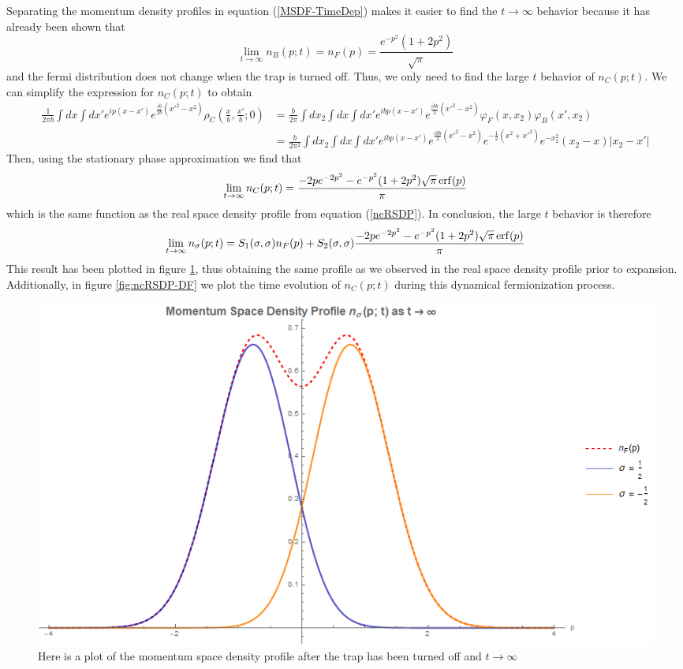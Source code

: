 \documentclass[onecolumn,english,aps,pra]{revtex4}
\begin{document}
Separating the momentum density profiles in equation (\ref{MSDF-TimeDep}) makes it  easier to find the $t \rightarrow \infty$ behavior because it has already been shown \cite{minguzzi2005exact} that
\begin{equation}
\lim_{t \rightarrow \infty} n_B(p;t) = n_F(p) = \frac{e^{-p^2}(1+2p^2)}{\sqrt{\pi}}
\end{equation}
and the fermi distribution does not change when the trap is turned off. Thus, we only need to find the large $t$ behavior of $n_C(p;t)$. We can simplify the expression for $n_C(p;t)$ to obtain
\begin{align*}
\frac{1}{2\pi b} \int dx \int dx' e^{ip(x-x')} e^{\frac{i\dot{b}}{2b}(x'^2 - x^2)}
\rho_C\left(\frac{x}{b},\frac{x'}{b};0\right) 
&= \frac{b}{2\pi} \int dx_2 \int dx \int dx' e^{ibp(x-x')} e^{\frac{i\dot{b}b}{2}(x'^2 - x^2)}
\varphi_F(x,x_2)\varphi_B(x',x_2)\\
&= \frac{b}{2\pi^2} \int dx_2 \int dx \int dx' e^{ibp(x-x')} e^{\frac{i\dot{b}b}{2}(x'^2 - x^2)}
e^{-\frac{1}{2}(x^2 + x'^2)}e^{-x_2^2} (x_2 -x)|x_2 - x'|
\end{align*}
Then, using the stationary phase approximation we find that
\begin{equation}
\lim_{t \rightarrow \infty} n_C(p;t) = \frac{-2pe^{-2p^2} - e^{-p^2}(1+2p^2)\sqrt{\pi}\erf(p)}{\pi}  
\label{ncMSDP-DF}
\end{equation}
which is the same function as the real space density profile from equation (\ref{ncRSDP}). In conclusion, the large $t$ behavior is therefore
\begin{equation}
\lim_{t \rightarrow \infty} n_\sigma(p;t) = S_1(\sigma, \sigma)n_F(p) + S_2(\sigma,\sigma) \frac{-2pe^{-2p^2} - e^{-p^2}(1+2p^2)\sqrt{\pi}\erf(p)}{\pi}
\end{equation} 
This result has been plotted in figure \ref{fig:nsMSDP-DF}, thus obtaining the same profile as we observed in the real space density profile prior to expansion. Additionally, in figure \ref{fig:ncRSDP-DF} we plot the time evolution of $n_C(p;t)$ during this dynamical fermionization process.\\

\begin{figure}[H]
\center
\includegraphics[scale=0.6]{"../Plots/MSDPMixedSpinorDF"}
\caption{Here is a plot of the momentum space density profile after the trap has been turned off and $t \rightarrow \infty$}
\label{fig:nsMSDP-DF}
\end{figure}
\end{document}
